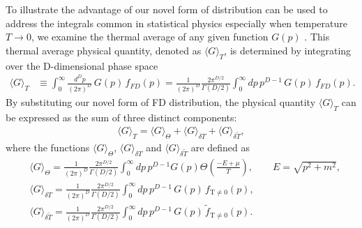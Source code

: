 \documentclass[sn-mathphys,Numbered]{sn-jnl}
\begin{document}
To illustrate the advantage of our novel form of distribution can be used to address the integrals common in statistical physics especially when temperature $T\to0$, we examine the thermal average of any given function $G(p)$ . This thermal average physical quantity, denoted as $\langle G\rangle_T$, is determined by integrating over the D-dimensional phase space 
\begin{align}
\langle G\rangle_T&\equiv\int^{\infty}_{0}\!\!\frac{d^Dp}{(2\pi)^D}\,G(p)\,f_{FD}(p)=\frac{1}{(2\pi)^D}\frac{2\pi^{D/2}}{\Gamma(D/2)}\int^{\infty}_{0}\!\!dp\,p^{D-1}\,G(p)\,f_{FD}(p).
\end{align}
By substituting our novel form of FD distribution, the physical quantity $\langle G\rangle_T$ can be expressed as the sum of three distinct components:
\begin{align}
\langle G\rangle_T=\langle G\rangle_{\Theta}+\langle G\rangle_{\delta T}+\langle G\rangle_{\delta \widetilde T},
\end{align}
 where the functions $\langle G\rangle_{\Theta}$, $\langle G\rangle_{\delta T}$ and $\langle G\rangle_{\delta \widetilde T}$ are defined as
\begin{align}
&\langle G\rangle_{\Theta}=\frac{1}{(2\pi)^D}\frac{2\pi^{D/2}}{\Gamma(D/2)}\int^{\infty}_{0}\!\!dp\,p^{D-1}G(p)\Theta\left(\frac{-E+\mu}{T}\right),\qquad E=\sqrt{p^2+m^2},\\
\label{G_deltaT}
&\langle G\rangle_{\delta T}=\frac{1}{(2\pi)^D}\frac{2\pi^{D/2}}{\Gamma(D/2)}\int^{\infty}_{0}\!\!dp\,p^{D-1}\,G(p)\,f_\mathrm{T\neq0}(p),\\
\label{G_deltaT2}
&\langle G\rangle_{\delta \widetilde T}=\frac{1}{(2\pi)^D}\frac{2\pi^{D/2}}{\Gamma(D/2)}\int^{\infty}_{0}\!\!dp\,p^{D-1}\,G(p)\,\widetilde f_\mathrm{T\neq0}(p).
\end{align}
\end{document}
